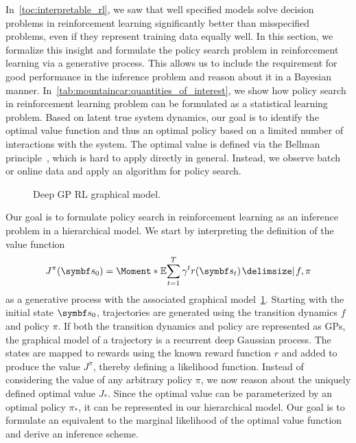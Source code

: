 In~\cref{toc:interpretable_rl}, we saw that well specified models solve decision problems in reinforcement learning significantly better than misspecified problems, even if they represent training data equally well.
In this section, we formalize this insight and formulate the policy search problem in reinforcement learning via a generative process.
This allows us to include the requirement for good performance in the inference problem and reason about it in a Bayesian manner.
In~\cref{tab:mountaincar:quantities_of_interest}, we show how policy search in reinforcement learning problem can be formulated as a statistical learning problem.
Based on latent true system dynamics, our goal is to identify the optimal value function and thus an optimal policy based on a limited number of interactions with the system.
The optimal value is defined via the Bellman principle~\parencite{sutton_reinforcement_2018}, which is hard to apply directly in general.
Instead, we observe batch or online data and apply an algorithm for policy search.

\begin{figure}[t]
    \centering
    
    \caption{
        \label{fig:mountaincar:graphical_model}
        Deep GP RL graphical model.
    }
\end{figure}
Our goal is to formulate policy search in reinforcement learning as an inference problem in a hierarchical model.
We start by interpreting the definition of the value function
\begin{align}
    J^\pi(\mat{s}_0) = \Moment*{\E}{\sum_{t=1}^T \gamma^t r(\mat{s}_t) \given f, \pi}
\end{align}
as a generative process with the associated graphical model~\cref{fig:mountaincar:graphical_model}.
Starting with the initial state $\mat{s}_0$, trajectories are generated using the transition dynamics $f$ and policy $\pi$.
If both the transition dynamics and policy are represented as GPs, the graphical model of a trajectory is a recurrent deep Gaussian process.
The states are mapped to rewards using the known reward function $r$ and added to produce the value $J^\pi$, thereby defining a likelihood function.
Instead of considering the value of any arbitrary policy $\pi$, we now reason about the uniquely defined optimal value $J_\ast$.
Since the optimal value can be parameterized by an optimal policy $\pi_\ast$, it can be represented in our hierarchical model.
Our goal is to formulate an equivalent to the marginal likelihood of the optimal value function and derive an inference scheme.

